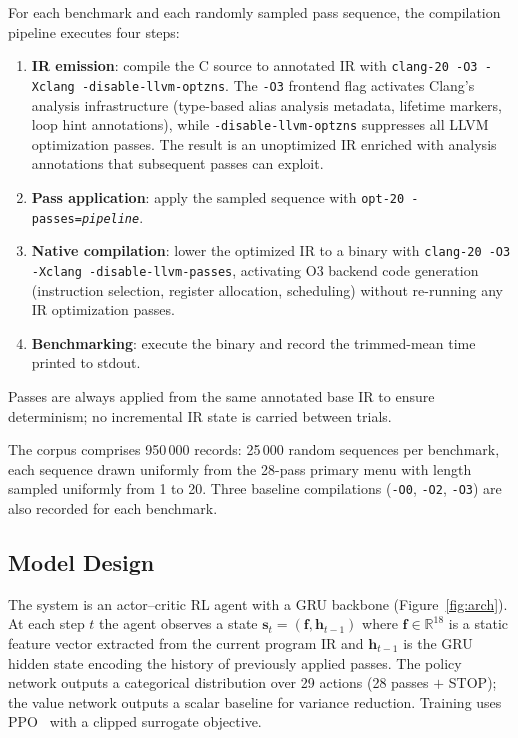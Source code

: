 \documentclass[conference]{IEEEtran}
\begin{document}
For each benchmark and each randomly sampled pass sequence, the compilation
pipeline executes four steps:
\begin{enumerate}
  \item \textbf{IR emission}: compile the C source to annotated IR with
        \texttt{clang-20 -O3 -Xclang -disable-llvm-optzns}.  The \texttt{-O3}
        frontend flag activates Clang's analysis infrastructure (type-based
        alias analysis metadata, lifetime markers, loop hint annotations),
        while \texttt{-disable-llvm-optzns} suppresses all LLVM optimization
        passes.  The result is an unoptimized IR enriched with analysis
        annotations that subsequent passes can exploit.
  \item \textbf{Pass application}: apply the sampled sequence with
        \texttt{opt-20 -passes=\textit{pipeline}}.
  \item \textbf{Native compilation}: lower the optimized IR to a binary with
        \texttt{clang-20 -O3 -Xclang -disable-llvm-passes}, activating O3
        backend code generation (instruction selection, register allocation,
        scheduling) without re-running any IR optimization passes.
  \item \textbf{Benchmarking}: execute the binary and record the trimmed-mean
        time printed to stdout.
\end{enumerate}
Passes are always applied from the same annotated base IR to ensure
determinism; no incremental IR state is carried between trials.

The corpus comprises 950\,000 records: 25\,000 random sequences per benchmark,
each sequence drawn uniformly from the 28-pass primary menu with length sampled
uniformly from 1 to 20.  Three baseline compilations
(\texttt{-O0}, \texttt{-O2}, \texttt{-O3}) are also recorded for each
benchmark.

\subsection{Model Design}

The system is an actor--critic RL agent with a GRU backbone
(Figure~\ref{fig:arch}).  At each step $t$ the agent observes a state
$\mathbf{s}_t = (\mathbf{f}, \mathbf{h}_{t-1})$ where
$\mathbf{f} \in \mathbb{R}^{18}$ is a static feature vector extracted from the
current program IR and $\mathbf{h}_{t-1}$ is the GRU hidden state encoding
the history of previously applied passes.  The policy network outputs a
categorical distribution over 29 actions (28 passes $+$ STOP); the value
network outputs a scalar baseline for variance reduction.  Training uses
PPO~\cite{schulman2017proximal} with a clipped surrogate objective.
\end{document}
